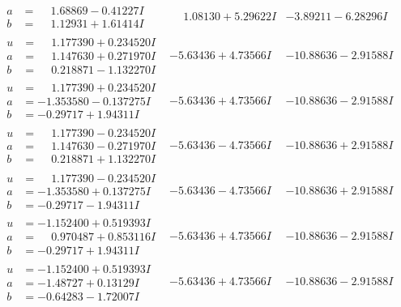 \documentclass[1p]{elsarticle_modified}
\theoremstyle{definition}
\begin{document}
$$\begin{array}{c|c|c}
\begin{aligned}
a &= \phantom{-}1.68869 - 0.41227 I \\
b &= \phantom{-}1.12931 + 1.61414 I\end{aligned}
 & \phantom{-}1.08130 + 5.29622 I & -3.89211 - 6.28296 I \\ \hline\begin{aligned}
u &= \phantom{-}1.177390 + 0.234520 I \\
a &= \phantom{-}1.147630 + 0.271970 I \\
b &= \phantom{-}0.218871 - 1.132270 I\end{aligned}
 & -5.63436 + 4.73566 I & -10.88636 - 2.91588 I \\ \hline\begin{aligned}
u &= \phantom{-}1.177390 + 0.234520 I \\
a &= -1.353580 - 0.137275 I \\
b &= -0.29717 + 1.94311 I\end{aligned}
 & -5.63436 + 4.73566 I & -10.88636 - 2.91588 I \\ \hline\begin{aligned}
u &= \phantom{-}1.177390 - 0.234520 I \\
a &= \phantom{-}1.147630 - 0.271970 I \\
b &= \phantom{-}0.218871 + 1.132270 I\end{aligned}
 & -5.63436 - 4.73566 I & -10.88636 + 2.91588 I \\ \hline\begin{aligned}
u &= \phantom{-}1.177390 - 0.234520 I \\
a &= -1.353580 + 0.137275 I \\
b &= -0.29717 - 1.94311 I\end{aligned}
 & -5.63436 - 4.73566 I & -10.88636 + 2.91588 I \\ \hline\begin{aligned}
u &= -1.152400 + 0.519393 I \\
a &= \phantom{-}0.970487 + 0.853116 I \\
b &= -0.29717 + 1.94311 I\end{aligned}
 & -5.63436 + 4.73566 I & -10.88636 - 2.91588 I \\ \hline\begin{aligned}
u &= -1.152400 + 0.519393 I \\
a &= -1.48727 + 0.13129 I \\
b &= -0.64283 - 1.72007 I\end{aligned}
 & -5.63436 + 4.73566 I & -10.88636 - 2.91588 I \\ \hline\begin{aligned}

\end{aligned}
\end{array}$$
\end{document}
